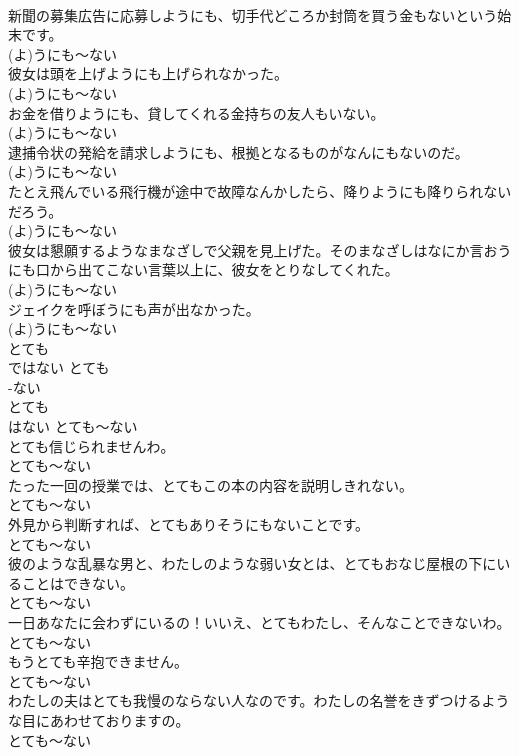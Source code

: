 \documentclass[8pt]{extreport}
\begin{document}
\begin{CJK}{UTF8}{min}
\\	新聞の募集広告に応募しようにも、切手代どころか封筒を買う金もないという始末です。	
\\	(よ)うにも～ない
\\	彼女は頭を上げようにも上げられなかった。	
\\	(よ)うにも～ない
\\	お金を借りようにも、貸してくれる金持ちの友人もいない。	
\\	(よ)うにも～ない
\\	逮捕令状の発給を請求しようにも、根拠となるものがなんにもないのだ。	
\\	(よ)うにも～ない
\\	たとえ飛んでいる飛行機が途中で故障なんかしたら、降りようにも降りられないだろう。	
\\	(よ)うにも～ない
\\	彼女は懇願するようなまなざしで父親を見上げた。そのまなざしはなにか言おうにも口から出てこない言葉以上に、彼女をとりなしてくれた。	
\\	(よ)うにも～ない
\\	ジェイクを呼ぼうにも声が出なかった。	
\\	(よ)うにも～ない
\\	とても 
\\	ではない	とても 
\\	-ない
\\	とても 
\\	はない	とても～ない
\\	とても信じられませんわ。	
\\	とても～ない
\\	たった一回の授業では、とてもこの本の内容を説明しきれない。	
\\	とても～ない
\\	外見から判断すれば、とてもありそうにもないことです。	
\\	とても～ない
\\	彼のような乱暴な男と、わたしのような弱い女とは、とてもおなじ屋根の下にいることはできない。	
\\	とても～ない
\\	一日あなたに会わずにいるの！いいえ、とてもわたし、そんなことできないわ。	
\\	とても～ない
\\	もうとても辛抱できません。	
\\	とても～ない
\\	わたしの夫はとても我慢のならない人なのです。わたしの名誉をきずつけるような目にあわせておりますの。	
\\	とても～ない

\end{CJK}
\end{document}

